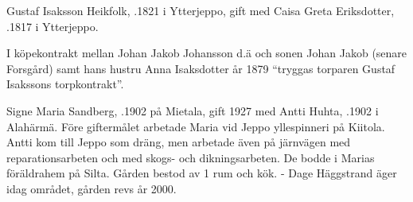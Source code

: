 Gustaf Isaksson Heikfolk, .1821 i Ytterjeppo, gift med Caisa Greta Eriksdotter, .1817 i Ytterjeppo.
\begin{jhchildren}
  \item {}
  \item {}
  \item {}
  \item {}
  \item {}
  \item {}
  \item {}
  \item {}
  \item {}
\end{jhchildren}
I köpekontrakt mellan Johan Jakob Johansson d.ä och sonen Johan Jakob (senare Forsgård) samt hans hustru Anna Isaksdotter år 1879 ``tryggas torparen Gustaf Isakssons torpkontrakt''.






Signe Maria Sandberg, .1902 på Mietala, gift 1927 med Antti Huhta, .1902 i Alahärmä. Före giftermålet arbetade Maria vid Jeppo yllespinneri på Kiitola. Antti kom till Jeppo som dräng, men arbetade även på järnvägen med reparationsarbeten och med skogs- och dikningsarbeten. De bodde i Marias föräldrahem på Silta. Gården bestod av 1 rum och kök. - Dage Häggstrand äger idag området, gården revs år 2000.
\begin{jhchildren}
  \item {}
  \item {}
  \item {}
\end{jhchildren}

